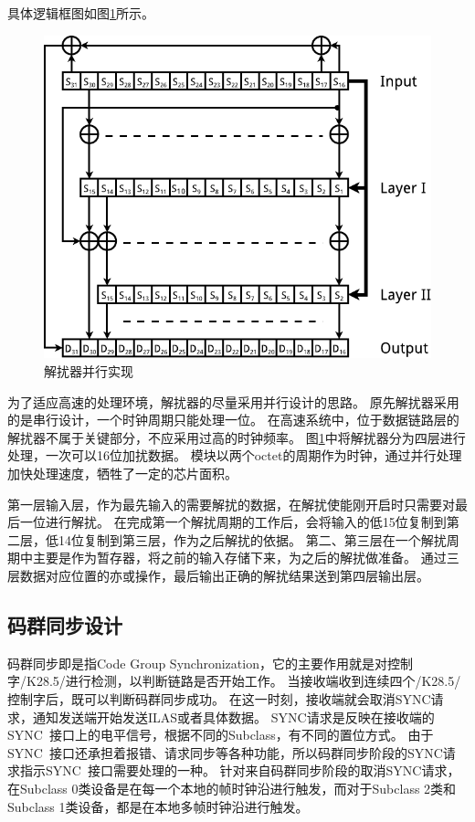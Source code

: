 \documentclass[UTF8]{ctexart}
\begin{document}
具体逻辑框图如图\ref{fig:scrambler_descrambler_parallel_implementation}所示。

\begin{figure}[H]
\centering
\includegraphics[width=18cm]{./img/scrambler_descrambler_parallel_implementation.pdf}
\caption{解扰器并行实现}
\label{fig:scrambler_descrambler_parallel_implementation}
\end{figure}

为了适应高速的处理环境，解扰器的尽量采用并行设计的思路。
原先解扰器采用的是串行设计，一个时钟周期只能处理一位。
在高速系统中，位于数据链路层的解扰器不属于关键部分，不应采用过高的时钟频率。
图\ref{fig:scrambler_descrambler_parallel_implementation}中将解扰器分为四层进行处理，一次可以16位加扰数据。
模块以两个octet的周期作为时钟，通过并行处理加快处理速度，牺牲了一定的芯片面积。

第一层输入层，作为最先输入的需要解扰的数据，在解扰使能刚开启时只需要对最后一位进行解扰。
在完成第一个解扰周期的工作后，会将输入的低15位复制到第二层，低14位复制到第三层，作为之后解扰的依据。
第二、第三层在一个解扰周期中主要是作为暂存器，将之前的输入存储下来，为之后的解扰做准备。
通过三层数据对应位置的亦或操作，最后输出正确的解扰结果送到第四层输出层。

\subsection{码群同步设计}

码群同步即是指Code Group Synchronization，它的主要作用就是对控制字/K28.5/进行检测，以判断链路是否开始工作。
当接收端收到连续四个/K28.5/控制字后，既可以判断码群同步成功。
在这一时刻，接收端就会取消SYNC请求，通知发送端开始发送ILAS或者具体数据。
SYNC请求是反映在接收端的SYNC~接口上的电平信号，根据不同的Subclass，有不同的置位方式。
由于SYNC~接口还承担着报错、请求同步等各种功能，所以码群同步阶段的SYNC请求指示SYNC~接口需要处理的一种。
针对来自码群同步阶段的取消SYNC请求，在Subclass 0类设备是在每一个本地的帧时钟沿进行触发，而对于Subclass 2类和Subclass 1类设备，都是在本地多帧时钟沿进行触发。
\end{document}
